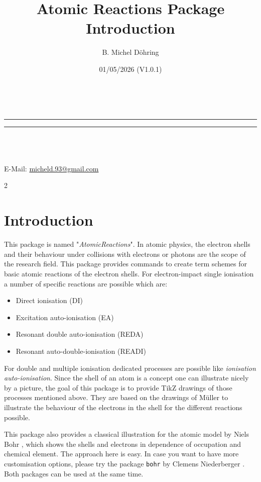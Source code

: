 \documentclass[
	a4paper,
	parskip=half,
    pagesize=auto,      		%
    listof=totoc,   		%
    bibliography=totoc,
	11pt
]{scrartcl}
\makeatletter
\newcommand{\linia}{\rule{\linewidth}{0.5pt} \rule{\linewidth}{0.5pt}}
\renewcommand{\maketitle}{
\begin{center}
\vspace{2ex}
{\huge \textsc{\@title}}
\vspace{1ex}
\\
\linia\\
\huge{\@date}\\
\vspace{5ex}
\@author\\ 
E-Mail: \href{mailto:micheld.93@ gmail.com}{micheld.93@gmail.com}\\
\vspace{10ex}
\end{center}
}
\makeatother
\begin{document}
\title{{\color[HTML]{FF0000} Atomic Reactions Package Introduction}}

\author{B. Michel Döhring}

\date{01/05/2026 (V1.0.1)}

\maketitle

\begin{multicols}{2}
\tableofcontents
\end{multicols}

\onehalfspacing 




\section{Introduction}

This package is named "\textit{AtomicReactions}".
In atomic physics, the electron shells and their behaviour under collisions with electrons or photons are the scope of the research field. 
This package provides commands to create term schemes for basic atomic reactions of the electron shells. 
For electron-impact single ionisation a number of specific reactions are possible which are: 

\begin{itemize}
    \item Direct ionisation (DI)
    \item Excitation auto-ionisation (EA)
    \item Resonant double auto-ionisation (REDA)
    \item Resonant auto-double-ionisation (READI)
\end{itemize}

For double and multiple ionisation dedicated processes are possible like \textit{ionisation auto-ionisation}. 
Since the shell of an atom is a concept one can illustrate nicely by a picture, the goal of this package is to provide TikZ \cite{tikz} drawings of those processes mentioned above. 
They are based on the drawings of Müller \cite{mueller2008} to illustrate the behaviour of the electrons in the shell for the different reactions possible. 

This package also provides a classical illustration for the atomic model by Niels Bohr \cite{bohr1913}, which shows the shells and electrons in dependence of occupation and chemical element.
The approach here is easy. In case you want to have more customisation options, please try the package \texttt{bohr} by Clemens Niederberger \cite{bohrCN}. Both packages can be used at the same time. 
\end{document}
